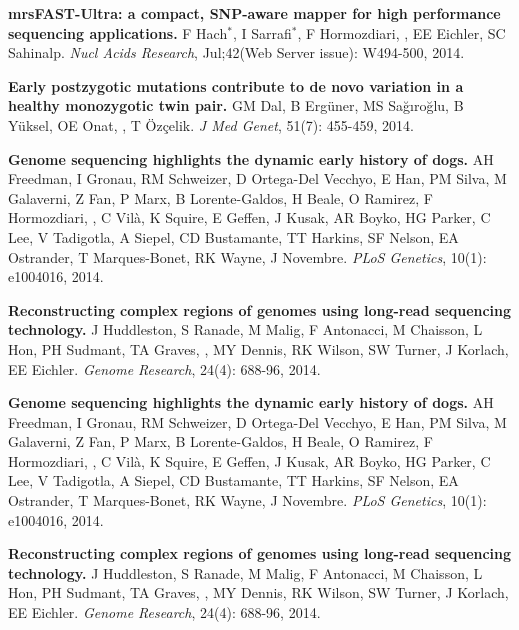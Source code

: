 \vspace{-.2cm}        
    {\bf mrsFAST-Ultra: a compact, SNP-aware mapper for high performance sequencing applications.}
    F Hach$^*$, I Sarrafi$^*$, F Hormozdiari, \calkan{}, EE Eichler, SC Sahinalp. 
    {\em Nucl Acids Research}, Jul;42(Web Server issue): W494-500, 2014.
    
\vspace{-.2cm}        
    {\bf Early postzygotic mutations contribute to de novo variation in a healthy monozygotic twin pair.}
    GM Dal, B Ergüner, MS Sağıroğlu, B Yüksel, OE Onat, \calkan{}, T Özçelik. 
    {\em J Med Genet}, 51(7): 455-459, 2014.


\vspace{-.2cm}
    {\bf Genome sequencing highlights the dynamic early history of dogs.}
    AH Freedman, I Gronau, RM Schweizer, D Ortega-Del Vecchyo, E Han, PM Silva, M Galaverni, Z Fan, P Marx, B Lorente-Galdos, H Beale, O Ramirez, F Hormozdiari, \calkan{}, C Vilà, K Squire, E Geffen, J Kusak, AR Boyko, HG Parker, C Lee, V Tadigotla, A Siepel, CD Bustamante, TT Harkins, SF Nelson, EA Ostrander, T Marques-Bonet, RK Wayne, J Novembre.
    {\em PLoS Genetics}, 10(1): e1004016, 2014.

\vspace{-.2cm}
    {\bf Reconstructing complex regions of genomes using long-read sequencing technology.}
    J Huddleston, S Ranade, M Malig, F Antonacci, M Chaisson, L Hon, PH Sudmant, TA Graves, \calkan{}, MY Dennis, RK Wilson, SW Turner, J Korlach, EE Eichler.
    {\em Genome Research}, 24(4): 688-96, 2014.

\vspace{-.2cm}
    {\bf Genome sequencing highlights the dynamic early history of dogs.}
    AH Freedman, I Gronau, RM Schweizer, D Ortega-Del Vecchyo, E Han, PM Silva, M Galaverni, Z Fan, P Marx, B Lorente-Galdos, H Beale, O Ramirez, F Hormozdiari, \calkan{}, C Vilà, K Squire, E Geffen, J Kusak, AR Boyko, HG Parker, C Lee, V Tadigotla, A Siepel, CD Bustamante, TT Harkins, SF Nelson, EA Ostrander, T Marques-Bonet, RK Wayne, J Novembre.
    {\em PLoS Genetics}, 10(1): e1004016, 2014.

\vspace{-.2cm}
    {\bf Reconstructing complex regions of genomes using long-read sequencing technology.}
    J Huddleston, S Ranade, M Malig, F Antonacci, M Chaisson, L Hon, PH Sudmant, TA Graves, \calkan{}, MY Dennis, RK Wilson, SW Turner, J Korlach, EE Eichler.
    {\em Genome Research}, 24(4): 688-96, 2014.

